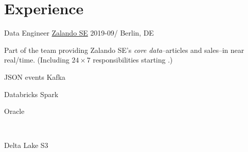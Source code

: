 \documentclass[%
version=last,%
fontsize=11pt,%
paper=A4,%
headinclude=false,%
footinclude=false,%
headlines=0,%
footlines=0,%
areasetadvanced,%
toc=bibnumbered,%
]{scrartcl}%
\begin{document}
\begin{minipage}[t]{0.575\textwidth}
  \vspace*{0cm}%
  \section{Experience}%
  \label{sec:experience}

  \WorkEntry%
  {Data Engineer}%
  {\href{https://corporate.zalando.com/en}{Zalando SE}}%
  {2019-09/}%
  {Berlin, DE}%
  {%
    Part of the team providing Zalando SE’s \emph{core data}\---articles and
    sales\---in near real\-/time. (Including \(24 \times 7\) responsibilities
    starting .)%
    \vspace*{20pt}\newline%
    \begingroup%
    \begin{minipage}{.2\linewidth}
      \begin{tcolorbox}[title=Nakadi, remember as=Kafka]
        JSON events%
        \tcblower%
        Kafka
      \end{tcolorbox}
    \end{minipage}%
    \hfill%
    \begin{minipage}{.2\linewidth}
      \begin{tcolorbox}[title=AWS, remember as=Spark]
        Databricks%
        \tcblower%
        Spark
      \end{tcolorbox}%
    \end{minipage}%
    \hfill%
    \begin{minipage}{.2\linewidth}
      \begin{tcolorbox}[remember as=Oracle]
        Oracle
      \end{tcolorbox}%
      \\%
      \begin{tcolorbox}[remember as=S3]
        Delta Lake%
        \tcblower%
        S3
      \end{tcolorbox}

\end{minipage}}
\end{minipage}
\end{document}
